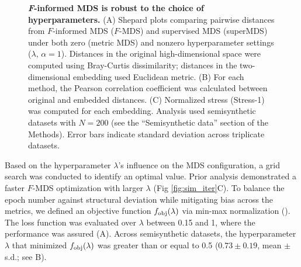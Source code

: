 \documentclass[10pt,letterpaper]{article}
\newcommand{\1}{{\rm 1}\kern-0.24em{\rm I}}
\begin{document}
\begin{figure}[h!]
    \centering
    \caption{\textbf{\textit{F}-informed MDS is robust to the choice of hyperparameters.} (A) Shepard plots comparing pairwise distances from $F$-informed MDS ($F$-MDS) and supervised MDS (superMDS) under both zero (metric MDS) and nonzero hyperparameter settings ($\lambda$, $\alpha=1$). Distances in the original high-dimensional space were computed using Bray-Curtis dissimilarity; distances in the two-dimensional embedding used Euclidean metric. (B) For each method, the Pearson correlation coefficient was calculated between original and embedded distances. (C) Normalized stress (Stress-1) was computed for each embedding. Analysis used semisynthetic datasets with $N=200$ (see the ``Semisynthetic data'' section of the Methods). Error bars indicate standard deviation across triplicate datasets.}
    \label{fig:mds_eval_sim}
\end{figure}


Based on the hyperparameter $\lambda$'s influence on the MDS configuration, a grid search was conducted to identify an optimal value. Prior analysis demonstrated a faster $F$-MDS optimization with larger $\lambda$ (Fig \ref{fig:sim_iter}C). To balance the epoch number against structural deviation while mitigating bias across the metrics, we defined an objective function $f_{\rm obj}(\lambda)$ via min-max normalization (). The loss function was evaluated over $\lambda$ between 0.15 and 1, where the performance was assured (A). Across semisynthetic datasets, the hyperparameter $\lambda$ that minimized $f_{\rm obj}(\lambda)$ was greater than or equal to 0.5 ($0.73\pm0.19$, mean $\pm$ s.d.; see B).

 
\end{document}
